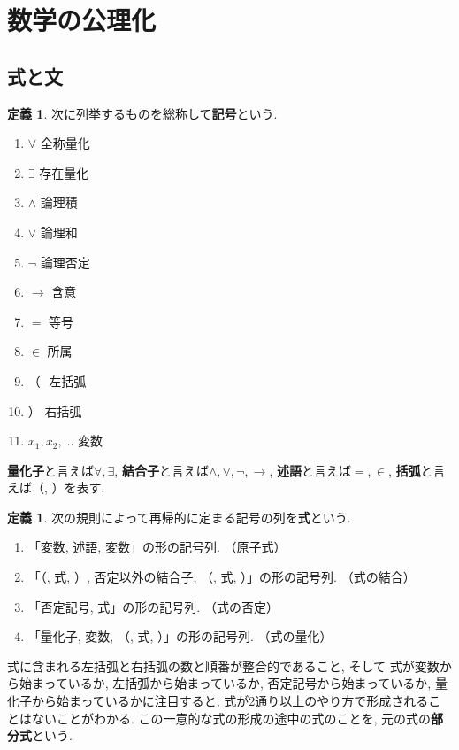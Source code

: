 \documentclass[a4paper]{bxjsarticle}
\theoremstyle{definition}
\newtheorem{defn}[thm]{定義}
\begin{document}
    \section{数学の公理化}
    \subsection{式と文}
    \begin{defn}
        次に列挙するものを総称して\textbf{記号}という.
        \begin{enumerate}
            \item $\forall$ 全称量化
            \item $\exists$ 存在量化
            \item $\land$ 論理積
            \item $\lor$ 論理和
            \item $\lnot$ 論理否定
            \item $\to$ 含意
            \item $=$ 等号
            \item $\in$ 所属
            \item  （ \,\,左括弧
            \item  ） 右括弧
            \item $x_1, x_2, \dots$ 変数
        \end{enumerate}
        \textbf{量化子}と言えば$\forall, \exists$,
        \textbf{結合子}と言えば$\land, \lor, \lnot, \to$, \textbf{述語}と言えば$=, \in$, \textbf{括弧}と言えば（, ）を表す.
    \end{defn}
    \begin{defn}    
        次の規則によって再帰的に定まる記号の列を\textbf{式}という.
        \begin{enumerate}
            \item 「変数, 述語, 変数」の形の記号列. （原子式）
            \item 「（, 式, ）, 否定以外の結合子, （, 式, ）」の形の記号列. （式の結合）
            \item 「否定記号, 式」の形の記号列. （式の否定）
            \item 「量化子, 変数, （, 式, ）」の形の記号列. （式の量化）
        \end{enumerate}
        式に含まれる左括弧と右括弧の数と順番が整合的であること, そして        式が変数から始まっているか, 左括弧から始まっているか, 否定記号から始まっているか, 量化子から始まっているかに注目すると, 式が2通り以上のやり方で形成されることはないことがわかる. この一意的な式の形成の途中の式のことを, 元の式の\textbf{部分式}という.
    \end{defn}
\end{document}
